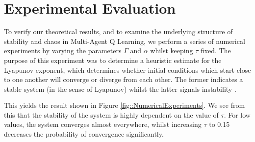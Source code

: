 \documentclass[letterpaper]{article} %
\begin{document}

\section{Experimental Evaluation}

To verify our theoretical results, and to examine the underlying structure of stability and chaos in
Multi-Agent Q Learning, we perform a series of numerical experiments by varying the parameters $\Gamma$ and
$\alpha$ whilst keeping $\tau$ fixed. The purpose of this experiment was to determine a heuristic estimate for the Lyapunov exponent, which determines whether initial conditions which start close to one another will converge or diverge from each other. The former indicates a stable system (in the sense of Lyapunov) whilst the latter signals instability \cite{Strogatz2000}.

This yields the result shown in
Figure \ref{fig::NumericalExperiments}. We see from this that the stability of the system is highly dependent on
the value of $\tau$.
For
low values, the system converges almost everywhere, whilst increasing $\tau$ to 0.15 decreases
the probability of convergence significantly.
\end{document}
